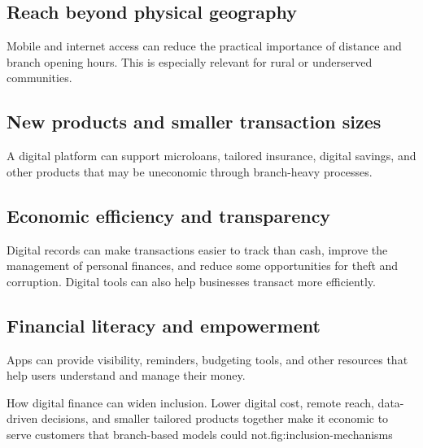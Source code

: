 \subsection{Reach beyond physical geography}

Mobile and internet access can reduce the practical importance of distance and branch opening hours. This is especially relevant for rural or underserved communities.

\subsection{New products and smaller transaction sizes}

A digital platform can support microloans, tailored insurance, digital savings, and other products that may be uneconomic through branch-heavy processes.

\subsection{Economic efficiency and transparency}

Digital records can make transactions easier to track than cash, improve the management of personal finances, and reduce some opportunities for theft and corruption. Digital tools can also help businesses transact more efficiently.

\subsection{Financial literacy and empowerment}

Apps can provide visibility, reminders, budgeting tools, and other resources that help users understand and manage their money.

\begin{utpfig}{How digital finance can widen inclusion. Lower digital cost, remote reach, data-driven decisions, and smaller tailored products together make it economic to serve customers that branch-based models could not.}{fig:inclusion-mechanisms}
\end{utpfig}

